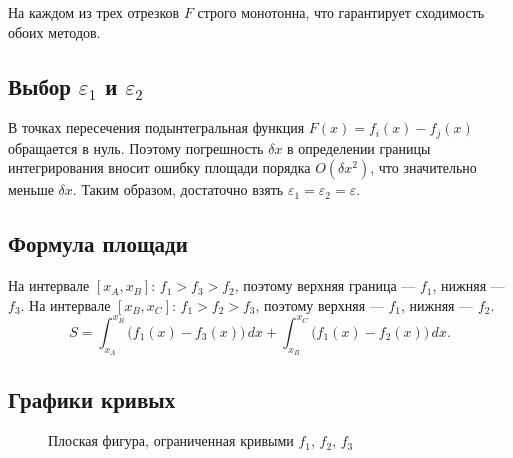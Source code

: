 \documentclass[a4paper,12pt,titlepage,finall]{article}
\begin{document}
На каждом из трех отрезков $F$ строго монотонна, что гарантирует сходимость обоих методов.

\subsection{Выбор $\varepsilon_1$ и $\varepsilon_2$}

В точках пересечения подынтегральная функция $F(x) = f_i(x) - f_j(x)$
обращается в нуль. Поэтому погрешность $\delta x$ в определении границы интегрирования
вносит ошибку площади порядка $O(\delta x^2)$, что значительно меньше $\delta x$.
Таким образом, достаточно взять $\varepsilon_1 = \varepsilon_2 = \varepsilon$.

\subsection{Формула площади}

На интервале $[x_A, x_B]$: $f_1 > f_3 > f_2$, поэтому верхняя граница --- $f_1$, нижняя --- $f_3$.
На интервале $[x_B, x_C]$: $f_1 > f_2 > f_3$, поэтому верхняя --- $f_1$, нижняя --- $f_2$.
\[
    S = \int_{x_A}^{x_B} \bigl(f_1(x) - f_3(x)\bigr)\,dx
      + \int_{x_B}^{x_C} \bigl(f_1(x) - f_2(x)\bigr)\,dx.
\]

\subsection{Графики кривых}

\begin{figure}[h]
\centering
{}
\caption{Плоская фигура, ограниченная кривыми $f_1$, $f_2$, $f_3$}
\label{plot1}
\end{figure}
\end{document}
